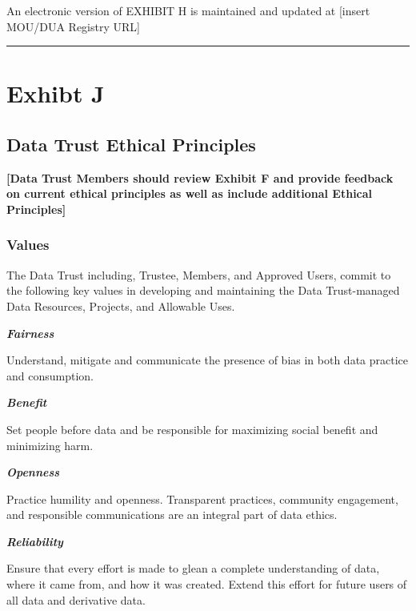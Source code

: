 \documentclass[]{book}
\begin{document}
An electronic version of EXHIBIT H is maintained and updated at {[}insert MOU/DUA Registry URL{]}

\begin{center}\rule{0.5\linewidth}{0.5pt}\end{center}

\hypertarget{exhibt-j}{%
\chapter*{Exhibt J}\label{exhibt-j}}

\hypertarget{data-trust-ethical-principles}{%
\section*{Data Trust Ethical Principles}\label{data-trust-ethical-principles}}

\textbf{{[}Data Trust Members should review Exhibit F and provide feedback on current ethical principles as well as include additional Ethical Principles{]}}

\hypertarget{values}{%
\subsection*{Values}\label{values}}

The Data Trust including, Trustee, Members, and Approved Users, commit to the following key values in developing and maintaining the Data Trust-managed Data Resources, Projects, and Allowable Uses.

\textbf{\emph{Fairness}}

Understand, mitigate and communicate the presence of bias in both data practice and consumption.

\textbf{\emph{Benefit}}

Set people before data and be responsible for maximizing social benefit and minimizing harm.

\textbf{\emph{Openness}}

Practice humility and openness. Transparent practices, community engagement, and responsible communications are an integral part of data ethics.

\textbf{\emph{Reliability}}

Ensure that every effort is made to glean a complete understanding of data, where it came from, and how it was created. Extend this effort for future users of all data and derivative data.
\end{document}
